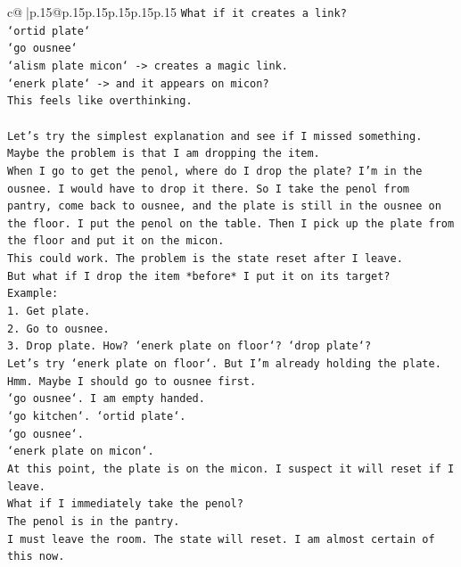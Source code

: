 \documentclass{article}
\begin{document}
{\begin{supertabular}{c@{$\;$}|p{.15\linewidth}@{}p{.15\linewidth}p{.15\linewidth}p{.15\linewidth}p{.15\linewidth}p{.15\linewidth}}
{{{\texttt{What if it creates a link?} \\
\texttt{`ortid plate`} \\
\texttt{`go ousnee`} \\
\texttt{`alism plate micon` {-}> creates a magic link.} \\
\texttt{`enerk plate` {-}> and it appears on micon?} \\
\texttt{This feels like overthinking.} \\
\\ 
\texttt{Let's try the simplest explanation and see if I missed something.} \\
\texttt{Maybe the problem is that I am dropping the item.} \\
\texttt{When I go to get the penol, where do I drop the plate? I'm in the ousnee. I would have to drop it there. So I take the penol from pantry, come back to ousnee, and the plate is still in the ousnee on the floor. I put the penol on the table. Then I pick up the plate from the floor and put it on the micon.} \\
\texttt{This could work. The problem is the state reset after I leave.} \\
\texttt{But what if I drop the item *before* I put it on its target?} \\
\texttt{Example:} \\
\texttt{1. Get plate.} \\
\texttt{2. Go to ousnee.} \\
\texttt{3. Drop plate. How? `enerk plate on floor`? `drop plate`?} \\
\texttt{Let's try `enerk plate on floor`. But I'm already holding the plate.} \\
\texttt{Hmm. Maybe I should go to ousnee first.} \\
\texttt{`go ousnee`. I am empty handed.} \\
\texttt{`go kitchen`. `ortid plate`.} \\
\texttt{`go ousnee`.} \\
\texttt{`enerk plate on micon`.} \\
\texttt{At this point, the plate is on the micon. I suspect it will reset if I leave.} \\
\texttt{What if I immediately take the penol?} \\
\texttt{The penol is in the pantry.} \\
\texttt{I must leave the room. The state will reset. I am almost certain of this now.} \\
\\ 
}}}
\end{supertabular}}
\end{document}
